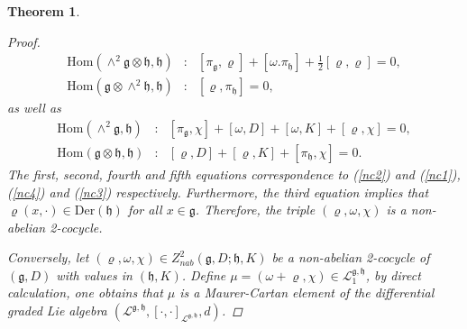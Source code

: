 \documentclass[12pt]{amsart}
\newtheorem{thm}{Theorem}[section]
\newcommand{\g}{\mathfrak g}
\newcommand{\h}{\mathfrak h}
\newcommand{\huaL}{\mathcal{L}}
\newcommand{\Hom}{\mathrm{Hom}}
\newcommand{\Der}{\mathrm{Der}}
\begin{document}
\begin{thm}
\begin{proof}
\begin{eqnarray*}
            \Hom(\wedge^{2}\g\otimes\h,\h)&:& [\pi_{\g},\varrho]+[\omega.\pi_{\h}]+\frac{1}{2}[\varrho,\varrho]=0,\\
            \Hom(\g\otimes\wedge^{2}\h,\h)&:&[\varrho,\pi_{\h}]=0,
        \end{eqnarray*}
        as well as
        \begin{eqnarray*}
            \Hom(\wedge^{2}\g,\h)&:&[\pi_{\g},\chi]+[\omega,D]+[\omega,K]+[\varrho,\chi]=0,\\
            \Hom(\g\otimes\h,\h)&:&[\varrho,D]+[\varrho,K]+[\pi_{\h},\chi]=0.
        \end{eqnarray*}
        The first, second, fourth and fifth equations correspondence to (\ref{nc2}) and (\ref{nc1}), (\ref{nc4}) and (\ref{nc3}) respectively. Furthermore, the third equation implies that $\varrho(x,\cdot)\in\Der(\h)$ for all $x\in\g$. Therefore, the triple $(\varrho,\omega,\chi)$ is a non-abelian 2-cocycle.

        Conversely, let $(\varrho,\omega,\chi)\in Z^{2}_{nab}(\g,D;\h,K)$ be a non-abelian 2-cocycle of $(\g,D)$ with values in $(\h,K)$. Define $\mu=(\omega+\varrho,\chi)\in \huaL^{\g, \h}_{1}$, by direct calculation, one obtains that $\mu$ is a Maurer-Cartan element of the differential graded Lie algebra $(\huaL^{\g, \h},[\cdot,\cdot]_{\huaL^{\g, \h}},d)$.
    \end{proof}
\end{thm}    
\end{document}
